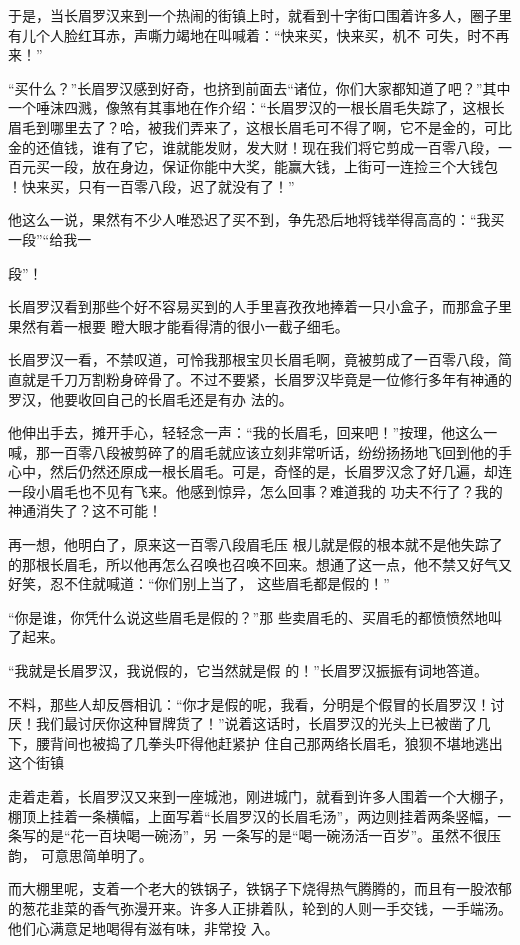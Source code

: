 \documentclass{article}
\begin{document}
于是，当长眉罗汉来到一个热闹的街镇上时，就看到十字街口围着许多人，圈子里有儿个人脸红耳赤，声嘶力竭地在叫喊着：“快来买，快来买，机不
可失，时不再来！” 

“买什么？”长眉罗汉感到好奇，也挤到前面去“诸位，你们大家都知道了吧？”其中一个唾沫四溅，像煞有其事地在作介绍：“长眉罗汉的一根长眉毛失踪了，这根长眉毛到哪里去了？哈，被我们弄来了，这根长眉毛可不得了啊，它不是金的，可比金的还值钱，谁有了它，谁就能发财，发大财！现在我们将它剪成一百零八段，一百元买一段，放在身边，保证你能中大奖，能赢大钱，上街可一连捡三个大钱包
！快来买，只有一百零八段，迟了就没有了！” 

他这么一说，果然有不少人唯恐迟了买不到，争先恐后地将钱举得高高的：“我买一段”“给我一
\newpage

段”！ 

长眉罗汉看到那些个好不容易买到的人手里喜孜孜地捧着一只小盒子，而那盒子里果然有着一根要
瞪大眼才能看得清的很小一截子细毛。 

长眉罗汉一看，不禁叹道，可怜我那根宝贝长眉毛啊，竟被剪成了一百零八段，简直就是千刀万割粉身碎骨了。不过不要紧，长眉罗汉毕竟是一位修行多年有神通的罗汉，他要收回自己的长眉毛还是有办
法的。 

他伸出手去，摊开手心，轻轻念一声：“我的长眉毛，回来吧！”按理，他这么一喊，那一百零八段被剪碎了的眉毛就应该立刻非常听话，纷纷扬扬地飞回到他的手心中，然后仍然还原成一根长眉毛。可是，奇怪的是，长眉罗汉念了好几遍，却连一段小眉毛也不见有飞来。他感到惊异，怎么回事？难道我的
功夫不行了？我的神通消失了？这不可能！ 

再一想，他明白了，原来这一百零八段眉毛压
\newpage
根儿就是假的根本就不是他失踪了的那根长眉毛，所以他再怎么召唤也召唤不回来。想通了这一点，他不禁又好气又好笑，忍不住就喊道：“你们别上当了，
这些眉毛都是假的！” 

“你是谁，你凭什么说这些眉毛是假的？”那
些卖眉毛的、买眉毛的都愤愤然地叫了起来。 

“我就是长眉罗汉，我说假的，它当然就是假
的！”长眉罗汉振振有词地答道。 

不料，那些人却反唇相讥：“你才是假的呢，我看，分明是个假冒的长眉罗汉！讨厌！我们最讨厌你这种冒牌货了！”说着这话时，长眉罗汉的光头上已被凿了几下，腰背间也被捣了几拳头吓得他赶紧护
住自己那两络长眉毛，狼狈不堪地逃出这个街镇 

走着走着，长眉罗汉又来到一座城池，刚进城门，就看到许多人围着一个大棚子，棚顶上挂着一条横幅，上面写着“长眉罗汉的长眉毛汤”，两边则挂着两条竖幅，一条写的是“花一百块喝一碗汤”，另
\newpage
一条写的是“喝一碗汤活一百岁”。虽然不很压韵，
可意思简单明了。 

而大棚里呢，支着一个老大的铁锅子，铁锅子下烧得热气腾腾的，而且有一股浓郁的葱花韭菜的香气弥漫开来。许多人正排着队，轮到的人则一手交钱，一手端汤。他们心满意足地喝得有滋有味，非常投
入。 
\end{document}
